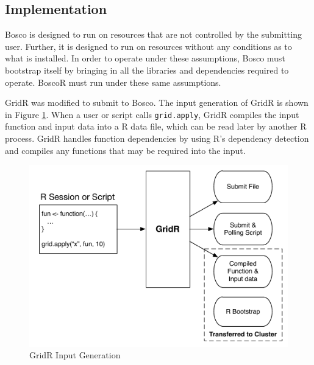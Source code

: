 \subsection{Implementation}
\label{sec:boscorimplementation}


Bosco is designed to run on resources that are not controlled by the submitting user.  Further, it is designed to run on resources without any conditions as to what is installed.  In order to operate under these assumptions, Bosco must bootstrap itself by bringing in all the libraries and dependencies required to operate.  BoscoR must run under these same assumptions.

GridR was modified to submit to Bosco.  The input generation of GridR is shown in Figure \ref{fig:gridrinput}.  When a user or script calls \texttt{grid.apply}, GridR compiles the input function and input data into a R data file, which can be read later by another R process.  GridR handles function dependencies by using R's dependency detection and compiles any functions that may be required into the input.  

\begin{figure}[h!t]
\centering
\includegraphics[width=\textwidth]{BoscoRImages/InputDiagram.pdf}
\caption{GridR Input Generation}
\label{fig:gridrinput}
\end{figure}

